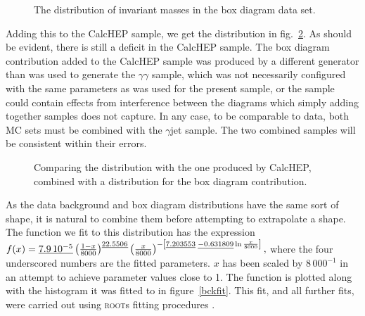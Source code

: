 \begin{figure}[htp]
\begin{minipage}[b]{.69\textwidth}
\begin{infilsf} \tiny

\end{infilsf}
\end{minipage}
\begin{minipage}[b]{.3\textwidth}
\caption{The distribution of invariant masses in the \atlas{} box diagram data set.}\label{boxmgg}
\end{minipage}
\end{figure}

Adding this to the CalcHEP sample, we get the distribution in fig.~\ref{ggcomp}. As should be evident, there is still a deficit in the CalcHEP sample. The box diagram contribution added to the CalcHEP sample was produced by a different generator than was used to generate the \atlas{} $\gamma\gamma$ sample, which was not necessarily configured with the same parameters as was used for the present sample, or the \altas{} sample could contain effects from interference between the diagrams which simply adding together samples does not capture. In any case, to be comparable to data, both MC sets must be combined with the $\gamma$jet sample. The two combined samples will be consistent within their errors.

\begin{figure}[htp]
\begin{minipage}[b]{.69\textwidth}
\begin{infilsf} \tiny

\end{infilsf}
\end{minipage}
\begin{minipage}[b]{.3\textwidth}
\caption{Comparing the \atlas{} distribution with the one produced by CalcHEP, combined with a distribution for the box diagram contribution.}\label{ggcomp}
\end{minipage}
\end{figure}

As the data background and box diagram distributions have the same sort of shape, it is natural to combine them before attempting to extrapolate a shape. The function we fit to this distribution has the expression
\(f(x)=\underline{7.9\,10^{-5}}\left(\frac{1-x}{8000}\right)^{\underline{22.5506}}\left(\frac{x}{8000}\right)^{-\left[\underline{7.203553}\;\underline{-0.631809}\ln\frac{x}{8000}\right]},\)
where the four underscored numbers are the fitted parameters. $x$ has been scaled by $8\,000^{-1}$ in an attempt to achieve parameter values close to 1. The function is plotted along with the histogram it was fitted to in figure~\ref{bckfit}. This fit, and all further fits, were carried out using \textsc{root}s fitting procedures \cite{root}.

